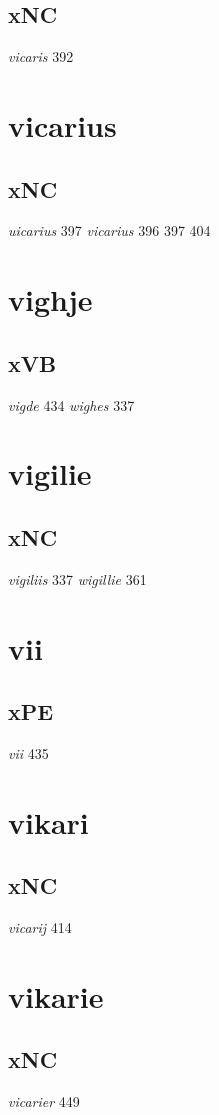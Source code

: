\documentclass[a4paper,twocolumn]{article}
\begin{document}
\subsection{xNC}
\label{sec:org76b146e}
\emph{vicaris} 392 
\section{vicarius}
\label{sec:orgf7228c2}
\subsection{xNC}
\label{sec:orge8f2c97}
\emph{uicarius} 397 \emph{vicarius} 396 397 404 
\section{vighje}
\label{sec:org5888d1a}
\subsection{xVB}
\label{sec:org9da4c2c}
\emph{vigde} 434 \emph{wighes} 337 
\section{vigilie}
\label{sec:org6622f82}
\subsection{xNC}
\label{sec:org68de514}
\emph{vigiliis} 337 \emph{wigillie} 361 
\section{vii}
\label{sec:orge490939}
\subsection{xPE}
\label{sec:orgb67ebd4}
\emph{vii} 435 
\section{vikari}
\label{sec:org8dd8bbe}
\subsection{xNC}
\label{sec:org293366d}
\emph{vicarij} 414 
\section{vikarie}
\label{sec:orgbdd8361}
\subsection{xNC}
\label{sec:orgc08b70c}
\emph{vicarier} 449 
\end{document}
